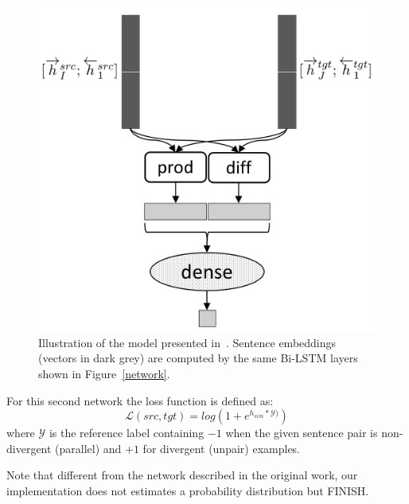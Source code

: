 \documentclass[11pt,a4paper]{article}
\begin{document}
\begin{figure}[h]
\center
    \includegraphics[width=0.8\linewidth]{net_sentence}
    \caption{Illustration of the model presented in~\cite{W17-2509}. Sentence embeddings (vectors in dark grey) are computed by the same Bi-LSTM layers shown in Figure~\ref{network}.} %
    \label{net_sentence}
\end{figure}

For this second network the loss function is defined as: 
\begin{equation}
\mathcal{L}(src,tgt) = log(1+e^{h_{sim} * \mathcal{Y})}) %
\label{loss_semb}
\end{equation}
\noindent where $\mathcal{Y}$ is the reference label containing $-1$ when the given sentence pair is non-divergent (parallel) and $+1$ for divergent (unpair) examples. 

Note that different from the network described in the original work, our implementation does not estimates a probability distribution but FINISH.

\end{document}
